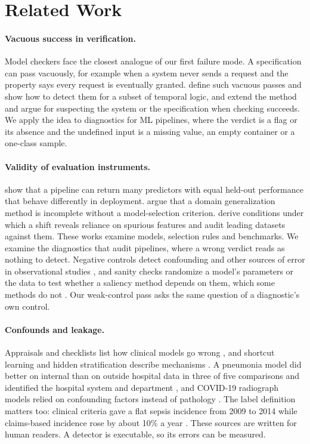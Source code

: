 \documentclass[10pt]{article}
\theoremstyle{definition}
\begin{document}
\section{Related Work}
\label{sec:related}

\paragraph{Vacuous success in verification.} Model checkers face the closest analogue of our first failure mode. A specification can pass vacuously, for example when a system never sends a request and the property says every request is eventually granted. \citet{beer1997vacuity} define such vacuous passes and show how to detect them for a subset of temporal logic, and \citet{kupferman2003vacuity} extend the method and argue for suspecting the system or the specification when checking succeeds. We apply the idea to diagnostics for ML pipelines, where the verdict is a flag or its absence and the undefined input is a missing value, an empty container or a one-class sample.

\paragraph{Validity of evaluation instruments.} \citet{damour2022underspecification} show that a pipeline can return many predictors with equal held-out performance that behave differently in deployment. \citet{gulrajani2021search} argue that a domain generalization method is incomplete without a model-selection criterion. \citet{salaudeen2025misspecified} derive conditions under which a shift reveals reliance on spurious features and audit leading datasets against them. These works examine models, selection rules and benchmarks. We examine the diagnostics that audit pipelines, where a wrong verdict reads as nothing to detect. Negative controls detect confounding and other sources of error in observational studies \citep{lipsitch2010negative}, and sanity checks randomize a model's parameters or the data to test whether a saliency method depends on them, which some methods do not \citep{adebayo2018sanity}. Our weak-control pass asks the same question of a diagnostic's own control.

\paragraph{Confounds and leakage.} Appraisals and checklists list how clinical models go wrong \citep{wynants2020prediction,roberts2021common,kapoor2023leakage}, and shortcut learning and hidden stratification describe mechanisms \citep{geirhos2020shortcut,oakdenrayner2020hidden}. A pneumonia model did better on internal than on outside hospital data in three of five comparisons and identified the hospital system and department \citep{zech2018variable}, and COVID-19 radiograph models relied on confounding factors instead of pathology \citep{degrave2021shortcuts}. The label definition matters too: clinical criteria gave a flat sepsis incidence from 2009 to 2014 while claims-based incidence rose by about 10\% a year \citep{rhee2017sepsis}. These sources are written for human readers. A detector is executable, so its errors can be measured.
\end{document}
